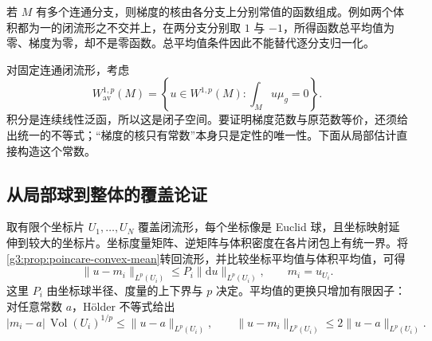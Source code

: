 若 \(M\) 有多个连通分支，则梯度的核由各分支上分别常值的函数组成。例如两个体积都为一的闭流形之不交并上，在两分支分别取 \(1\) 与 \(-1\)，所得函数总平均值为零、梯度为零，却不是零函数。总平均值条件因此不能替代逐分支归一化。

\ProseParagraphBreak

对固定连通闭流形，考虑
\[
	W^{1,p}_{\mathrm{av}}(M)=\left\{u\in W^{1,p}(M):\int_Mu\mu_g=0\right\}.
\]
积分是连续线性泛函，所以这是闭子空间。要证明梯度范数与原范数等价，还须给出统一的不等式；“梯度的核只有常数”本身只是定性的唯一性。下面从局部估计直接构造这个常数。

\subsection{从局部球到整体的覆盖论证}
\label{g3:subsec:1104:03}
取有限个坐标片 \(U_1,\ldots,U_N\) 覆盖闭流形，每个坐标像是 Euclid 球，且坐标映射延伸到较大的坐标片。坐标度量矩阵、逆矩阵与体积密度在各片闭包上有统一界。将\cref{g3:prop:poincare-convex-mean}转回流形，并比较坐标平均值与体积平均值，可得
\begin{equation}\label{g3:eq:local-poincare-cover}
	\|u-m_i\|_{L^p(U_i)}\le P_i\|\mathrm du\|_{L^p(U_i)},
	\qquad m_i=u_{U_i}.
\end{equation}
这里 \(P_i\) 由坐标球半径、度量的上下界与 \(p\) 决定。平均值的更换只增加有限因子：对任意常数 \(a\)，Hölder 不等式给出
\[
	|m_i-a|\,\operatorname{Vol}(U_i)^{1/p}\le\|u-a\|_{L^p(U_i)},
	\qquad
	\|u-m_i\|_{L^p(U_i)}\le2\|u-a\|_{L^p(U_i)}.
\]

